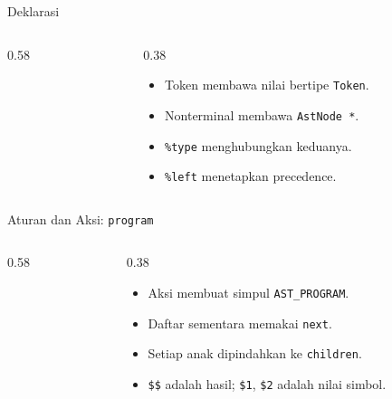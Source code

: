 \documentclass[aspectratio=169,10pt,t]{beamer}
\begin{document}
\begin{frame}[fragile]{Deklarasi }
  \begin{columns}[T,onlytextwidth]
    \begin{column}{0.58\textwidth}
      
    \end{column}
    \begin{column}{0.38\textwidth}
      \begin{itemize}
        \item Token membawa nilai bertipe \texttt{Token}.
        \item Nonterminal membawa \texttt{AstNode *}.
        \item \texttt{\%type} menghubungkan keduanya.
        \item \texttt{\%left} menetapkan precedence.
      \end{itemize}
    \end{column}
  \end{columns}
\end{frame}

\begin{frame}[fragile]{Aturan dan Aksi: \texttt{program}}
  \begin{columns}[T,onlytextwidth]
    \begin{column}{0.58\textwidth}
      
    \end{column}
    \begin{column}{0.38\textwidth}
      \begin{itemize}
        \item Aksi membuat simpul \texttt{AST\_PROGRAM}.
        \item Daftar sementara memakai \texttt{next}.
        \item Setiap anak dipindahkan ke \texttt{children}.
        \item \texttt{\$\$} adalah hasil; \texttt{\$1}, \texttt{\$2}
              adalah nilai simbol.
      \end{itemize}
    \end{column}
  \end{columns}
\end{frame}
\end{document}
